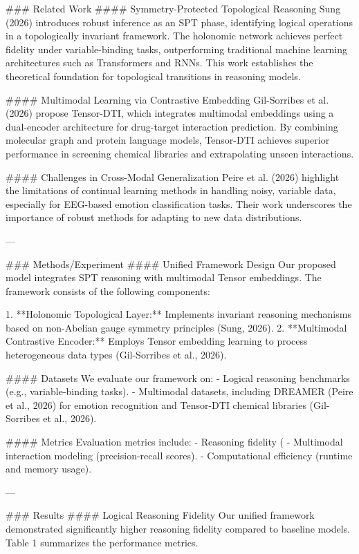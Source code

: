 ### Related Work  
#### Symmetry-Protected Topological Reasoning  
Sung (2026) introduces robust inference as an SPT phase, identifying logical operations in a topologically invariant framework. The holonomic network achieves perfect fidelity under variable-binding tasks, outperforming traditional machine learning architectures such as Transformers and RNNs. This work establishes the theoretical foundation for topological transitions in reasoning models.

#### Multimodal Learning via Contrastive Embedding  
Gil-Sorribes et al. (2026) propose Tensor-DTI, which integrates multimodal embeddings using a dual-encoder architecture for drug-target interaction prediction. By combining molecular graph and protein language models, Tensor-DTI achieves superior performance in screening chemical libraries and extrapolating unseen interactions.

#### Challenges in Cross-Modal Generalization  
Peire et al. (2026) highlight the limitations of continual learning methods in handling noisy, variable data, especially for EEG-based emotion classification tasks. Their work underscores the importance of robust methods for adapting to new data distributions.

---

### Methods/Experiment  
#### Unified Framework Design  
Our proposed model integrates SPT reasoning with multimodal Tensor embeddings. The framework consists of the following components:

1. **Holonomic Topological Layer:** Implements invariant reasoning mechanisms based on non-Abelian gauge symmetry principles (Sung, 2026).  
2. **Multimodal Contrastive Encoder:** Employs Tensor embedding learning to process heterogeneous data types (Gil-Sorribes et al., 2026).  

#### Datasets  
We evaluate our framework on:  
- Logical reasoning benchmarks (e.g., variable-binding tasks).  
- Multimodal datasets, including DREAMER (Peire et al., 2026) for emotion recognition and Tensor-DTI chemical libraries (Gil-Sorribes et al., 2026).

#### Metrics  
Evaluation metrics include:  
- Reasoning fidelity (%
- Multimodal interaction modeling (precision-recall scores).  
- Computational efficiency (runtime and memory usage).

---

### Results  
#### Logical Reasoning Fidelity  
Our unified framework demonstrated significantly higher reasoning fidelity compared to baseline models. Table 1 summarizes the performance metrics.

